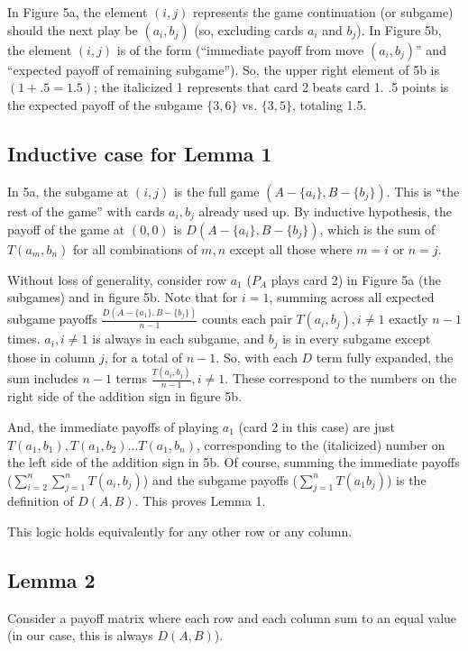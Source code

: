 \documentclass[11pt, oneside]{article} 	%
\begin{document}
In Figure 5a, the element $(i,j)$ represents the game continuation (or subgame) should the next play be $(a_i, b_j)$ (so, excluding cards $a_i$ and $b_j$). 
In Figure 5b, the element $(i,j)$ is of the form (``immediate payoff from move $(a_i, b_j)$'' and ``expected payoff of remaining subgame''). So, the upper right element of 5b is $(\mathit{1} + .5 = 1.5)$; the italicized 1 represents that card 2 beats card 1. .5 points is the expected payoff of the subgame $\{3,6\}$ vs. $\{3,5\}$, totaling 1.5. 

\subsection{Inductive case for Lemma 1}

In 5a, the subgame at $(i, j)$ is the full game $(A - \{a_i\}, B-\{b_j\})$. This is ``the rest of the game'' with cards $a_i, b_j$ already used up. By inductive hypothesis, the payoff of the game at $(0,0)$ is $D(A-\{a_i\}, B-\{b_j\})$, which is the sum of $T(a_m, b_n)$ for all combinations of $m, n$ except all those where $m=i$ or $n=j$. 

Without loss of generality, consider row $a_1$ ($P_A$ plays card 2) in Figure 5a (the subgames) and in figure 5b. Note that for $i=1$, summing across all expected subgame payoffs $\frac{D(A-\{a_1\}, B-\{b_j\})}{n-1}$ counts each pair $T(a_i, b_j), i \neq 1$ exactly $n-1$ times. $a_i, i \neq 1$ is always in each subgame, and $b_j$ is in every subgame except those in column $j$, for a total of $n-1$. So, with each $D$ term fully expanded, the sum includes $n-1$ terms $\frac{T(a_i, b_j)}{n-1}, i \neq 1$. These correspond to the numbers on the right side of the addition sign in figure 5b.

And, the immediate payoffs of playing $a_1$ (card 2 in this case) are just $T(a_1, b_1), T(a_1, b_2)... T(a_1, b_n)$, corresponding to the (italicized) number on the left side of the addition sign in 5b. Of course, summing the immediate payoffs ($\sum_{i=2}^n\sum_{j=1}^n T(a_i, b_j)$) and the subgame payoffs ($\sum_{j=1}^n T(a_1 b_j)$) is the definition of $D(A,B)$. This proves Lemma 1.

This logic holds equivalently for any other row or any column.

\subsection{Lemma 2}

Consider a payoff matrix where each row and each column sum to an equal value (in our case, this is always $D(A,B)$).
\end{document}
